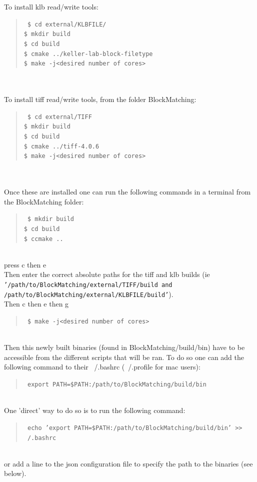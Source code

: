 \documentclass[10pt,a4paper]{book}
\newcommand{\option}[1]{{\texttt{'#1'}}}
\newenvironment{code}[1]{\mbox{}\\[1ex]\hspace*{-#1cm}\begin{minipage}{150mm}\begin{quote}\tt}{\end{quote}\end{minipage}\mbox{}\\[1ex]}
\begin{document}
{To install klb read/write tools:
\begin{code}{0.8}
\$ cd external/KLBFILE/ \\
\$ mkdir build \\
\$ cd build \\
\$ cmake ../keller-lab-block-filetype \\
\$ make -j<desired number of cores> \\
\end{code}
\\
To install tiff read/write tools, from the folder BlockMatching:
\begin{code}{0.8}
\$ cd external/TIFF \\
\$ mkdir build \\
\$ cd build \\
\$ cmake ../tiff-4.0.6 \\
\$ make -j<desired number of cores> \\
\end{code}
\\
Once these are installed one can run the following commands in a terminal from the BlockMatching folder:
\begin{code}{0.8}
\$ mkdir build \\
\$ cd build \\
\$ ccmake .. \\
\end{code}
press c then e\\
Then enter the correct absolute paths for the tiff and klb builds (ie \option{/path/to/BlockMatching/external/TIFF/build and /path/to/BlockMatching/external/KLBFILE/build}).\\
Then c then e then g
\begin{code}{0.8}
\$ make -j<desired number of cores> \\
\end{code}
Then this newly built binaries (found in BlockMatching/build/bin) have to be accessible from the different scripts that will be ran. To do so one can add the following command to their ~/.bashrc (~/.profile for mac users):
\begin{code}{0.8}
export PATH=\$PATH:/path/to/BlockMatching/build/bin
\end{code}
One 'direct' way to do so is to run the following command:
\begin{code}{0.8}
echo 'export PATH=\$PATH:/path/to/BlockMatching/build/bin' >> ~/.bashrc
\end{code}
or add a line to the json configuration file to specify the path to the binaries (see below).\\
}
\end{document}
